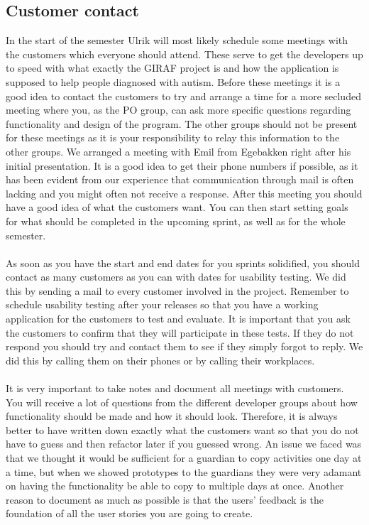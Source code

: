 \subsection{Customer contact}
In the start of the semester Ulrik will most likely schedule some meetings with the customers which everyone should attend.
These serve to get the developers up to speed with what exactly the GIRAF project is and how the application is supposed to help people diagnosed with autism.
Before these meetings it is a good idea to contact the customers to try and arrange a time for a more secluded meeting where you, as the PO group, can ask more specific questions regarding functionality and design of the program.
The other groups should not be present for these meetings as it is your responsibility to relay this information to the other groups.
We arranged a meeting with Emil from Egebakken right after his initial presentation.
It is a good idea to get their phone numbers if possible, as it has been evident from our experience that communication through mail is often lacking and you might often not receive a response.
After this meeting you should have a good idea of what the customers want.
You can then start setting goals for what should be completed in the upcoming sprint, as well as for the whole semester.
\\\\
As soon as you have the start and end dates for you sprints solidified, you should contact as many customers as you can with dates for usability testing. 
We did this by sending a mail to every customer involved in the project.
Remember to schedule usability testing after your releases so that you have a working application for the customers to test and evaluate.
It is important that you ask the customers to confirm that they will participate in these tests.
If they do not respond you should try and contact them to see if they simply forgot to reply.
We did this by calling them on their phones or by calling their workplaces.
\\\\
It is very important to take notes and document all meetings with customers.
You will receive a lot of questions from the different developer groups about how functionality should be made and how it should look.
Therefore, it is always better to have written down exactly what the customers want so that you do not have to guess and then refactor later if you guessed wrong.
An issue we faced was that we thought it would be sufficient for a guardian to copy activities one day at a time, but when we showed prototypes to the guardians they were very adamant on having the functionality be able to copy to multiple days at once.
Another reason to document as much as possible is that the users' feedback is the foundation of all the user stories you are going to create.

